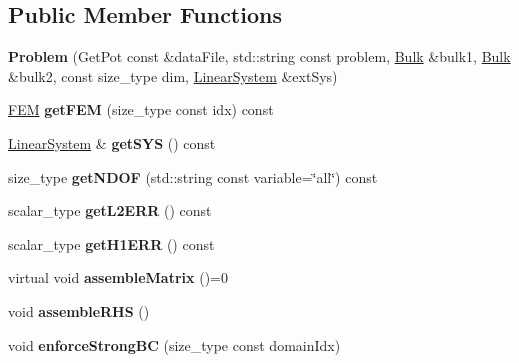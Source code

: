 \subsection*{Public Member Functions}
\begin{DoxyCompactItemize}
\item 
\mbox{\label{classProblem_ae48369cd7f0fd844855055fde437b658}} 
{\bfseries Problem} (Get\+Pot const \&data\+File, std\+::string const problem, \hyperlink{classBulk}{Bulk} \&bulk1, \hyperlink{classBulk}{Bulk} \&bulk2, const size\+\_\+type dim, \hyperlink{classLinearSystem}{Linear\+System} \&ext\+Sys)
\item 
\mbox{\label{classProblem_aabf50a05ce09ac973c6f7baae0d79a36}} 
\hyperlink{classFEM}{F\+EM} {\bfseries get\+F\+EM} (size\+\_\+type const idx) const
\item 
\mbox{\label{classProblem_a842e147eb80b8c0a4480804f5e13c501}} 
\hyperlink{classLinearSystem}{Linear\+System} \& {\bfseries get\+S\+YS} () const
\item 
\mbox{\label{classProblem_a0778563987b8c77f26607869ae62f8e5}} 
size\+\_\+type {\bfseries get\+N\+D\+OF} (std\+::string const variable=\char`\"{}all\char`\"{}) const
\item 
\mbox{\label{classProblem_ad497cda7281ccc702dca456cb458160d}} 
scalar\+\_\+type {\bfseries get\+L2\+E\+RR} () const
\item 
\mbox{\label{classProblem_a3f70e73a231833475bb495d657505196}} 
scalar\+\_\+type {\bfseries get\+H1\+E\+RR} () const
\item 
\mbox{\label{classProblem_a834cfdf8d3909ad602712989dccac7c9}} 
virtual void {\bfseries assemble\+Matrix} ()=0
\item 
\mbox{\label{classProblem_a3a8e521f1ee3ade892978709bd7857f0}} 
void {\bfseries assemble\+R\+HS} ()
\item 
\mbox{\label{classProblem_ac197fe1d6ebae761fddacab2539c7fb4}} 
void {\bfseries enforce\+Strong\+BC} (size\+\_\+type const domain\+Idx)
\item 

\end{DoxyCompactItemize}
